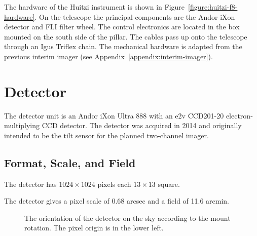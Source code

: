 The hardware of the Huitzi instrument is shown in Figure~\ref{figure:huitzi-f8-hardware}. On the telescope the principal components are the Andor iXon detector and FLI filter wheel. The control electronics are located in the box mounted on the south side of the pillar. The cables pass up onto the telescope through an Igus Triflex chain. The mechanical hardware is adapted from the previous interim imager (see Appendix~\ref{appendix:interim-imager}).

\section{Detector}

The detector unit is an Andor iXon Ultra 888 with an e2v CCD201-20 electron-multiplying CCD detector. The detector was acquired in 2014 and originally intended to be the tilt sensor for the planned two-channel imager.

\subsection{Format, Scale, and Field}

The detector has $1024\times1024$ pixels each $13\times13$ {\micron} square. 

The detector gives a pixel scale of 0.68 arcsec and a field of 11.6 arcmin. 

\begin{figure}
\begin{center}
\end{center}
\caption{The orientation of the detector on the sky according to the mount rotation. The pixel origin is in the lower left.}
\label{figure:detector-orientation}
\end{figure}

